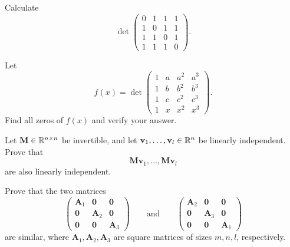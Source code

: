 \begin{problem}
Calculate
\[
\det
\begin{pmatrix}
0&1&1&1\\
1&0&1&1\\
1&1&0&1\\
1&1&1&0
\end{pmatrix}.
\]
\end{problem}

\begin{problem}
Let
\[
f(x)=
\det
\begin{pmatrix}
1&a&a^2&a^3\\
1&b&b^2&b^3\\
1&c&c^2&c^3\\
1&x&x^2&x^3
\end{pmatrix}.
\]
Find all zeros of $f(x)$ and verify your answer.
\end{problem}

\begin{problem}
Let $\mathbf M\in\mathbb{R}^{n\times n}$ be invertible, and let $\mathbf v_1,\dots,\mathbf v_l\in\mathbb{R}^n$ be linearly independent. Prove that
\[
\mathbf M\mathbf v_1,\dots,\mathbf M\mathbf v_l
\]
are also linearly independent.
\end{problem}

\begin{problem}
Prove that the two matrices
\[
\begin{pmatrix}
\mathbf A_1&\mathbf 0&\mathbf 0\\
\mathbf 0&\mathbf A_2&\mathbf 0\\
\mathbf 0&\mathbf 0&\mathbf A_3
\end{pmatrix}
\qquad\text{and}\qquad
\begin{pmatrix}
\mathbf A_2&\mathbf 0&\mathbf 0\\
\mathbf 0&\mathbf A_3&\mathbf 0\\
\mathbf 0&\mathbf 0&\mathbf A_1
\end{pmatrix}
\]
are similar, where $\mathbf A_1,\mathbf A_2,\mathbf A_3$ are square matrices of sizes $m,n,l$, respectively.
\end{problem}


